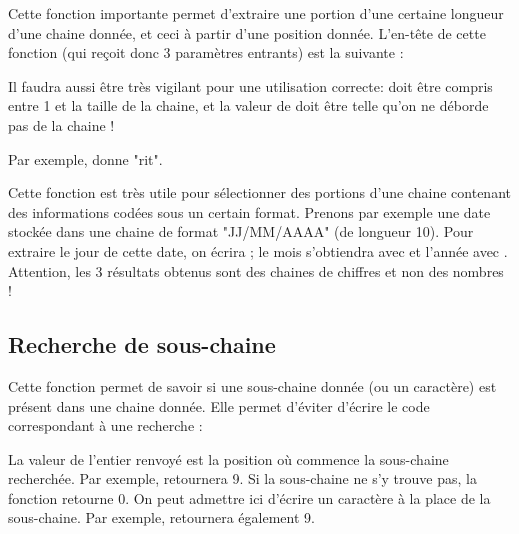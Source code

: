 		Cette fonction importante 
		permet d'extraire une portion 
		d'une certaine longueur d'une chaine donnée, 
		et ceci à partir d'une position donnée. 
		L'en-tête de cette fonction 
		(qui reçoit donc 3 paramètres entrants) est la suivante :

		\begin{center}
		\end{center}

		Il faudra aussi être très vigilant 
		pour une utilisation correcte: 
		 doit être compris entre 1 et la taille de la chaine, 
		et la valeur de  doit être telle 
		qu'on ne déborde pas de la chaine ! 

		Par exemple,  
		donne "rit".

		Cette fonction est très utile pour sélectionner 
		des portions d'une chaine 
		contenant des informations codées sous un certain format. 
		Prenons par exemple une date stockée dans une chaine de format 
		"JJ/MM/AAAA" (de longueur 10). 
		Pour extraire le jour de cette date, 
		on écrira  ; 
		le mois s'obtiendra avec  
		et l'année avec . 
		Attention, les 3 résultats obtenus sont des chaines de chiffres 
		et non des nombres !

	\subsection{Recherche de sous-chaine}
	
		Cette fonction permet de savoir 
		si une sous-chaine donnée (ou un caractère) 
		est présent dans une chaine donnée. 
		Elle permet d'éviter d'écrire 
		le code correspondant à une recherche : 

		\begin{center}
		\end{center}

		La valeur de l'entier renvoyé est la position 
		où commence la sous-chaine recherchée. 
		Par exemple, 
		 retournera 9. 
		Si la sous-chaine ne s'y trouve pas, 
		la fonction retourne 0. 
		On peut admettre ici d'écrire un caractère à la place de la sous-chaine. 
		Par exemple, 
		retournera également 9. 
		
